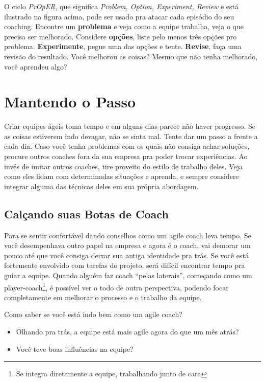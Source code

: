 \documentclass[a4paper, 10pt, font=plain]{abnt}
\begin{document}
O ciclo \textit{PrOpER}, que significa \textit{Problem, Option, Experiment, Review} e está ilustrado na figura acima, pode ser usado pra atacar cada episódio do seu coaching.
Encontre um \textbf{problema} e veja como a equipe trabalha, veja o que precisa ser melhorado. Considere \textbf{opções}, liste pelo menos três opções pro problema. \textbf{Experimente}, pegue uma das opções e tente. \textbf{Revise}, faça uma revisão do resultado. Você melhorou as coisas? Mesmo que não tenha melhorado, você aprendeu algo?


\section{Mantendo o Passo}
Criar equipes ágeis toma tempo e em alguns dias parece não haver progresso. Se as coisas estiverem indo devagar, não se sinta mal. Tente dar um passo a frente a cada dia.
Caso você tenha problemas com os quais não consiga achar soluções, procure outros coaches fora da sua empresa pra poder trocar experiências. Ao invés de imitar outros coaches, tire proveito do estilo de trabalho deles. Veja como eles lidam com determinadas situações e aprenda, e sempre considere integrar alguma das técnicas deles em sua própria abordagem.



\subsection{Calçando suas Botas de Coach}
Para se sentir confortável dando conselhos como um agile coach leva tempo. Se você desempenhava outro papel na empresa e agora é o coach, vai demorar um pouco até que você consiga deixar sua antiga identidade pra trás.
Se você está fortemente envolvido com tarefas do projeto, será difícil encontrar tempo pra guiar a equipe. Quando alguém faz coach ``pelas laterais'', começando como um player-coach\footnote{Se integra diretamente a equipe, trabalhando junto de cara}, é possível ver o todo de outra perspectiva, podendo focar completamente em melhorar o processo e o trabalho da equipe.

Como saber se você está indo bem como um agile coach?
\begin{itemize}
  \item Olhando pra trás, a equipe está mais agile agora do que um mês atrás?
  \item Você teve boas influências na equipe?
\end{itemize}
\end{document}
